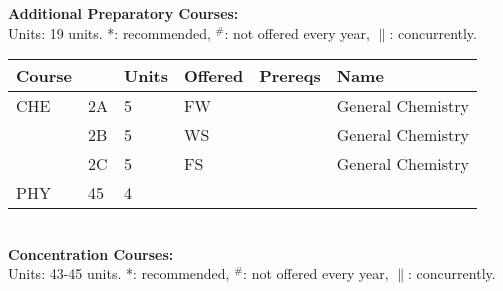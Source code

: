 \documentclass[12pt]{article}
\begin{document}
\newpage
{}
\vskip 0.25cm
\noindent
{\bf Additional Preparatory Courses:  }\\
Units:  19 units. *: recommended, $^\#$: not offered every year, $\parallel$: concurrently.\\
\begin{tabular}{|llllll|}
\hline
Course & & Units & Offered & Prereqs & Name \\
\hline
\hline
CHE  & 2A      & 5 & FW & & General Chemistry \\
     & 2B      & 5 & WS & & General Chemistry \\
     & 2C      & 5 & FS & & General Chemistry \\
PHY  & 45      & 4 & & & \\
\hline
\end{tabular}\\
\noindent
{\bf Concentration Courses:  }\\
Units:  43-45 units. *: recommended, $^\#$: not offered every year, $\parallel$: concurrently.\\
\end{document}

